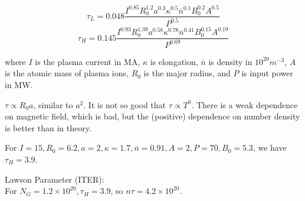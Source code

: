 \documentclass[12pt]{article}
\begin{document}
$$\tau_L = 0.048 \frac{I^{0.85}R_0^{1.2}a^{0.3}\kappa^{0.5}\overline{n}^{0.1} B_0^{0.2}A^{0.5}}{P^{0.5}}$$
$$\tau_H = 0.145 \frac{I^{0.93}R_0^{1.39}a^{0.58}\kappa^{0.78}\overline{n}^{0.41}B_0^{0.15}A^{0.19}}{P^{0.69}}$$

where $I$ is the plasma current in MA, $\kappa$ is elongation, $\overline n$ is density in $10^{20}\unit{m^{-3}}$, $A$ is the atomic mass of plasma ions, $R_0$ is the major radius, and $P$ is input power in MW.

$\tau \propto R_0a$, similar to $a^2$. It is not so good that $\tau \propto T^0$. There is a weak dependence on magnetic field, which is bad, but the (positive) dependence on number density is better than in theory.

\begin{ex}[ITER]
    For $I = 15, R_0 = 6.2, a = 2, \kappa = 1.7, \overline n = 0.91, A = 2, P = 70, B_0 = 5.3$, we have $\tau_H = 3.9$.
\end{ex}

Lawson Parameter (ITER): \\
For $N_G = 1.2 \times 10^{20}, \tau_H = 3.9$, so $n\tau = 4.2 \times 10^{20}$.
\end{document}

